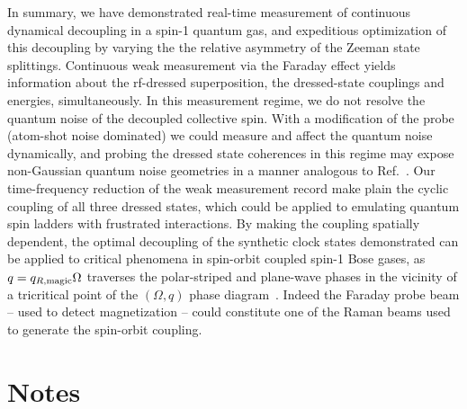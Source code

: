 \documentclass[aps,prl,reprint,superscriptaddress,floatfix]{revtex4-1}
\begin{document}
In summary, we have demonstrated real-time measurement of continuous dynamical decoupling in a spin-1 quantum gas, and expeditious optimization of this decoupling by varying the the relative asymmetry of the Zeeman state splittings.
Continuous weak measurement via the Faraday effect yields information about the rf-dressed superposition, the dressed-state couplings and energies, simultaneously.
In this measurement regime, we do not resolve the quantum noise of the decoupled collective spin.
With a modification of the probe (atom-shot noise dominated) we could measure and affect the quantum noise dynamically,
and probing the dressed state coherences in this regime may expose non-Gaussian quantum noise geometries in a manner analogous to Ref.~\cite{colangelo_simultaneous_2017}.
Our time-frequency reduction of the weak measurement record make plain the cyclic coupling of all three dressed states, which could be applied to emulating quantum spin ladders with frustrated interactions.
By making the coupling spatially dependent, the optimal decoupling of the synthetic clock states demonstrated can be applied to critical phenomena in spin-orbit coupled spin-1 Bose gases, as $q = q_{R,\text{magic}} \Omega$ traverses the polar-striped and plane-wave phases in the vicinity of a tricritical point of the $(\Omega, q)$ phase diagram~\cite{martone_tricriticalities_2016}.
Indeed the Faraday probe beam -- used to detect magnetization -- could constitute one of the Raman beams used to generate the spin-orbit coupling.



\clearpage
\appendix
\section{Notes}
\end{document}
